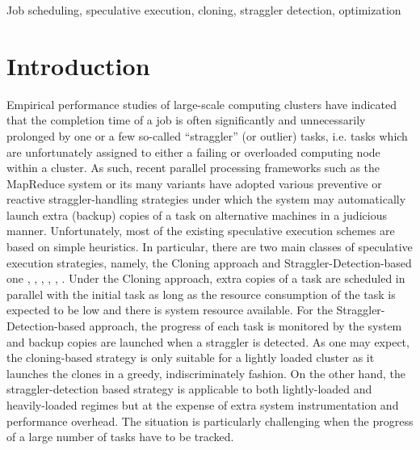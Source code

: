 \documentclass[10pt,conference]{IEEEtran}
\begin{document}
\begin{keywords}
Job scheduling, speculative execution, cloning, straggler detection, optimization
\end{keywords}




\section{Introduction}
\label{Introduction}
Empirical performance studies of large-scale computing clusters have indicated that the completion time of a job {\cite{Outliers}}
is often significantly and unnecessarily prolonged by one or a few so-called ``straggler'' (or outlier) tasks, i.e. tasks which are unfortunately assigned to either a failing or overloaded computing node within a cluster.
As such, recent parallel processing frameworks such as the MapReduce system or its many variants have adopted various preventive or reactive straggler-handling strategies under which the system may automatically launch extra (backup) copies of a task on alternative machines in a judicious manner. Unfortunately, most of the existing speculative execution schemes are based on simple heuristics. In particular, there are two main classes of speculative execution strategies, namely, the Cloning {\cite{Cloning}} approach and Straggler-Detection-based one {\cite{Outliers}}, {\cite{Smart_Speculative}}, {\cite{mapreduce:google}}, {\cite{Dryad}}, {\cite{ESAMR}}, {\cite{Performance}}. Under the Cloning approach, extra copies of a task are scheduled in parallel with the initial task as long as the resource consumption of the task is expected to be low and there is system resource available. For the Straggler-Detection-based approach, the progress of each task is monitored by the system and backup copies are launched when a straggler is detected.
As one may expect, the cloning-based strategy is only suitable for a lightly loaded cluster as it launches the clones in a greedy, indiscriminately fashion. On the other hand,  the straggler-detection based strategy is applicable to both lightly-loaded and heavily-loaded regimes but at the expense of extra system instrumentation and performance overhead. The situation is particularly challenging when the progress of a large number of tasks have to be tracked.
\end{document}
